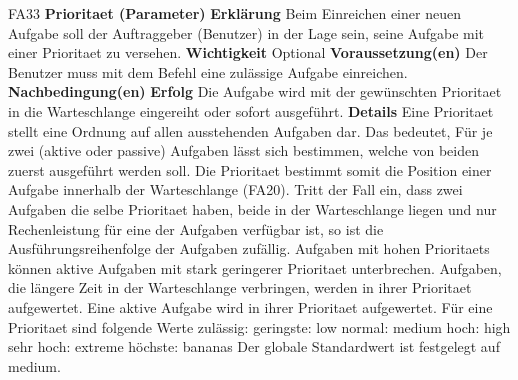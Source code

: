 \documentclass[a4paper,12pt]{article}
\begin{document}
\begin{itemize}[nosep]
\begin{minipage}[t]{\linewidth}
\item[FA33] \textbf{\gls{Prioritaet} (Parameter)}
\subitem \textbf{Erklärung} Beim Einreichen einer neuen Aufgabe soll der Auftraggeber (\gls{Benutzer}) in der Lage sein, seine Aufgabe mit einer \gls{Prioritaet} zu versehen.
\subitem \textbf{Wichtigkeit} Optional
\subitem \textbf{Voraussetzung(en)} Der Benutzer muss mit dem Befehl eine zulässige Aufgabe einreichen.
\subitem \textbf{Nachbedingung(en)}
\subsubitem \textbf{Erfolg} Die Aufgabe wird mit der gewünschten \gls{Prioritaet} in die Warteschlange eingereiht oder sofort ausgeführt.
\subitem \textbf{Details} Eine \gls{Prioritaet} stellt eine Ordnung auf allen ausstehenden Aufgaben dar. Das bedeutet, Für je zwei (aktive oder passive) Aufgaben lässt sich bestimmen, welche von beiden zuerst ausgeführt werden soll.\newline
Die \gls{Prioritaet} bestimmt somit die Position einer Aufgabe innerhalb der Warteschlange (FA20).\newline
Tritt der Fall ein, dass zwei Aufgaben die selbe \gls{Prioritaet} haben, beide in der Warteschlange liegen und nur Rechenleistung für eine der Aufgaben verfügbar ist, so ist die Ausführungsreihenfolge der Aufgaben zufällig.\newline
Aufgaben mit hohen \glspl{Prioritaet} können aktive Aufgaben mit stark geringerer \gls{Prioritaet} unterbrechen.\newline
Aufgaben, die längere Zeit in der Warteschlange verbringen, werden in ihrer \gls{Prioritaet} aufgewertet.\newline
Eine aktive Aufgabe wird in ihrer \gls{Prioritaet} aufgewertet.\newline
Für eine \gls{Prioritaet} sind folgende Werte zulässig:\newline
geringste: low\newline
normal: medium\newline
hoch: high\newline
sehr hoch: extreme\newline
höchste: bananas\newline
Der globale Standardwert ist festgelegt auf medium.
\end{minipage}
\pagebreak


\end{itemize}
\end{document}
